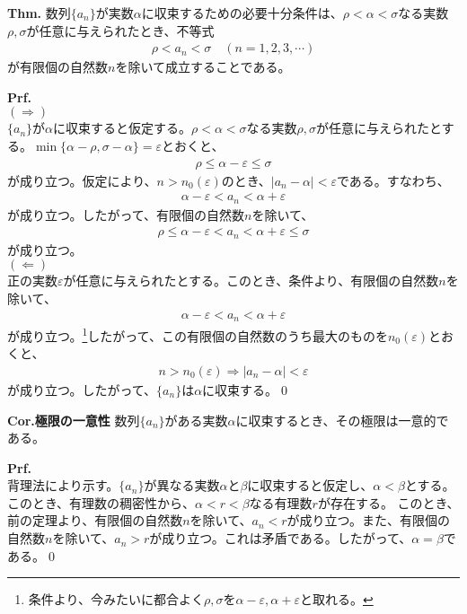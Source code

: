 \documentclass[a4paper,11pt]{jsarticle}
\numberwithin{equation}{section}
\begin{document}
\begin{itembox}[l]{\textbf{Thm.}}
    数列$\{a_n\}$が実数$\alpha$に収束するための必要十分条件は、$\rho<\alpha<\sigma$なる実数$\rho,\sigma$が任意に与えられたとき、不等式
    \begin{align}
        \rho < a_n < \sigma \quad (n=1,2,3,\cdots)
    \end{align}
    が有限個の自然数$n$を除いて成立することである。
\end{itembox}
\textbf{Prf.}\\
$(\Rightarrow)$\\
$\{a_n\}$が$\alpha$に収束すると仮定する。$\rho<\alpha<\sigma$なる実数$\rho,\sigma$が任意に与えられたとする。$\min\{\alpha-\rho,\sigma-\alpha\} = \varepsilon$とおくと、
\begin{align}
    \rho \leq \alpha - \varepsilon \leq \sigma
\end{align}
が成り立つ。仮定により、$n > n_0(\varepsilon)$のとき、$|a_n - \alpha| < \varepsilon$である。すなわち、
\begin{align}
    \alpha - \varepsilon < a_n < \alpha + \varepsilon
\end{align}
が成り立つ。したがって、有限個の自然数$n$を除いて、
\begin{align}
    \rho \leq \alpha - \varepsilon < a_n < \alpha + \varepsilon \leq \sigma
\end{align}
が成り立つ。\\
$(\Leftarrow)$\\
正の実数$\varepsilon$が任意に与えられたとする。このとき、条件より、有限個の自然数$n$を除いて、
\begin{align}
    \alpha - \varepsilon < a_n < \alpha + \varepsilon
\end{align}
が成り立つ。\footnote{条件より、今みたいに都合よく$\rho,\sigma$を$\alpha-\varepsilon,\alpha+\varepsilon$と取れる。}したがって、この有限個の自然数のうち最大のものを$n_0(\varepsilon)$とおくと、
\begin{align}
    n > n_0(\varepsilon) \Rightarrow |a_n - \alpha| < \varepsilon
\end{align}
が成り立つ。したがって、$\{a_n\}$は$\alpha$に収束する。\qed

\begin{itembox}[l]{\textbf{Cor.極限の一意性}}
    数列$\{a_n\}$がある実数$\alpha$に収束するとき、その極限は一意的である。
\end{itembox}
\textbf{Prf.}\\
背理法により示す。$\{a_n\}$が異なる実数$\alpha$と$\beta$に収束すると仮定し、$\alpha < \beta$とする。このとき、有理数の稠密性から、$\alpha < r < \beta$なる有理数$r$が存在する。
このとき、前の定理より、有限個の自然数$n$を除いて、$a_n < r$が成り立つ。また、有限個の自然数$n$を除いて、$a_n > r$が成り立つ。これは矛盾である。したがって、$\alpha = \beta$である。\qed
\end{document}
